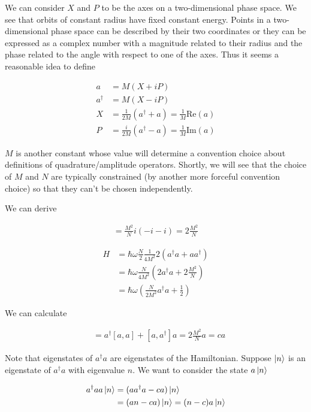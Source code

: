 \documentclass[12pt]{article}
\begin{document}
We can consider $X$ and $P$ to be the axes on a two-dimensional phase space. We see that orbits of constant radius have fixed constant energy. Points in a two-dimensional phase space can be described by their two coordinates or they can be expressed as a complex number with a magnitude related to their radius and the phase related to the angle with respect to one of the axes. Thus it seems a reasonable idea to define

\begin{align}
a &= M(X+i P)\\
a^{\dag} &= M(X-i P)\\
X &= \frac{1}{2M} (a^{\dag}+a) = \frac{1}{M}\text{Re}(a)\\
P &= \frac{i}{2M} (a^{\dag}-a) = \frac{1}{M}\text{Im}(a)
\end{align}

$M$ is another constant whose value will determine a convention choice about definitions of quadrature/amplitude operators. Shortly, we will see that the choice of $M$ and $N$ are typically constrained (by another more forceful convention choice) so that they can't be chosen independently.

We can derive

\begin{align}
[a,a^{\dag}] = \frac{M^2}{N}i(-i-i) = 2\frac{M^2}{N}
\end{align}

\begin{align}
H &= \hbar \omega \frac{N}{2}\frac{1}{4M^2} 2(a^{\dag}a+aa^{\dag})\\
&= \hbar \omega \frac{N}{4M^2}(2a^{\dag}a + 2\frac{M^2}{N})\\
&= \hbar \omega\left( \frac{N}{2M^2} a^{\dag}a + \frac{1}{2} \right)
\end{align}

We can calculate

\begin{align}
[a,a^{\dag}a] &= a^{\dag}[a,a] + [a,a^{\dag}]a = 2\frac{M^2}{N} a = ca
\end{align}

Note that eigenstates of $a^{\dag}a$ are eigenstates of the Hamiltonian. Suppose $\ket{n}$ is an eigenstate of $a^{\dag}a$ with eigenvalue $n$. We want to consider the state $a\ket{n}$

\begin{align}
a^{\dag}a a \ket{n} &= (a a^{\dag} a - ca) \ket{n}\\
&= (an - ca)\ket{n} = (n-c)a\ket{n}
\end{align}
\end{document}
